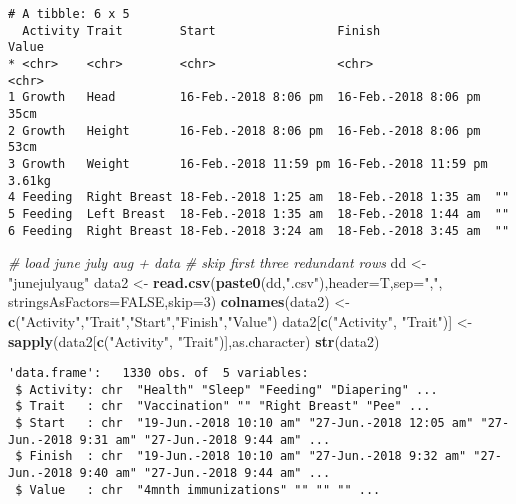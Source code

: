 \documentclass[10,portrait]{article}
\newenvironment{Shaded}{\begin{snugshade}}{\end{snugshade}}
\newcommand{\KeywordTok}[1]{\textcolor[rgb]{0.13,0.29,0.53}{\textbf{#1}}}
\newcommand{\DataTypeTok}[1]{\textcolor[rgb]{0.13,0.29,0.53}{#1}}
\newcommand{\DecValTok}[1]{\textcolor[rgb]{0.00,0.00,0.81}{#1}}
\newcommand{\StringTok}[1]{\textcolor[rgb]{0.31,0.60,0.02}{#1}}
\newcommand{\CommentTok}[1]{\textcolor[rgb]{0.56,0.35,0.01}{\textit{#1}}}
\newcommand{\OtherTok}[1]{\textcolor[rgb]{0.56,0.35,0.01}{#1}}
\newcommand{\NormalTok}[1]{#1}
\begin{document}
\begin{verbatim}
# A tibble: 6 x 5
  Activity Trait        Start                 Finish                Value 
* <chr>    <chr>        <chr>                 <chr>                 <chr> 
1 Growth   Head         16-Feb.-2018 8:06 pm  16-Feb.-2018 8:06 pm  35cm  
2 Growth   Height       16-Feb.-2018 8:06 pm  16-Feb.-2018 8:06 pm  53cm  
3 Growth   Weight       16-Feb.-2018 11:59 pm 16-Feb.-2018 11:59 pm 3.61kg
4 Feeding  Right Breast 18-Feb.-2018 1:25 am  18-Feb.-2018 1:35 am  ""    
5 Feeding  Left Breast  18-Feb.-2018 1:35 am  18-Feb.-2018 1:44 am  ""    
6 Feeding  Right Breast 18-Feb.-2018 3:24 am  18-Feb.-2018 3:45 am  ""    
\end{verbatim}

\begin{Shaded}
\begin{Highlighting}[]
\CommentTok{# load june july aug + data}
\CommentTok{# skip first three redundant rows}
\NormalTok{dd <-}\StringTok{ "junejulyaug"}
\NormalTok{data2 <-}\StringTok{ }\KeywordTok{read.csv}\NormalTok{(}\KeywordTok{paste0}\NormalTok{(dd,}\StringTok{".csv"}\NormalTok{),}\DataTypeTok{header=}\NormalTok{T,}\DataTypeTok{sep=}\StringTok{","}\NormalTok{, }\DataTypeTok{stringsAsFactors=}\OtherTok{FALSE}\NormalTok{,}\DataTypeTok{skip=}\DecValTok{3}\NormalTok{)}
\KeywordTok{colnames}\NormalTok{(data2) <-}\StringTok{ }\KeywordTok{c}\NormalTok{(}\StringTok{"Activity"}\NormalTok{,}\StringTok{"Trait"}\NormalTok{,}\StringTok{"Start"}\NormalTok{,}\StringTok{"Finish"}\NormalTok{,}\StringTok{"Value"}\NormalTok{)}
\NormalTok{data2[}\KeywordTok{c}\NormalTok{(}\StringTok{"Activity"}\NormalTok{, }\StringTok{"Trait"}\NormalTok{)] <-}\StringTok{ }\KeywordTok{sapply}\NormalTok{(data2[}\KeywordTok{c}\NormalTok{(}\StringTok{"Activity"}\NormalTok{, }\StringTok{"Trait"}\NormalTok{)],as.character)}
\KeywordTok{str}\NormalTok{(data2) }
\end{Highlighting}
\end{Shaded}

\begin{verbatim}
'data.frame':   1330 obs. of  5 variables:
 $ Activity: chr  "Health" "Sleep" "Feeding" "Diapering" ...
 $ Trait   : chr  "Vaccination" "" "Right Breast" "Pee" ...
 $ Start   : chr  "19-Jun.-2018 10:10 am" "27-Jun.-2018 12:05 am" "27-Jun.-2018 9:31 am" "27-Jun.-2018 9:44 am" ...
 $ Finish  : chr  "19-Jun.-2018 10:10 am" "27-Jun.-2018 9:32 am" "27-Jun.-2018 9:40 am" "27-Jun.-2018 9:44 am" ...
 $ Value   : chr  "4mnth immunizations" "" "" "" ...
\end{verbatim}
\end{document}
